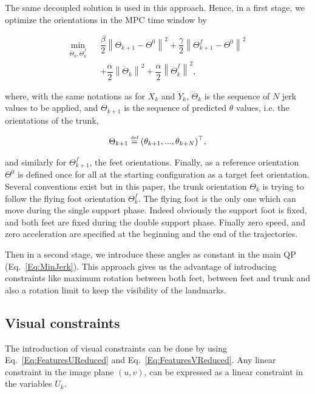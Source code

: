The same decoupled solution is used in this approach. Hence, in a first stage, we optimize the orientations in the MPC time window by  

{\small
\begin{eqnarray}
 \min\limits_{\dddot{\Theta}_{k},\dddot{\Theta}^{f}_k }  &&  \dfrac{\beta}{2} \left\| \Theta_{k+1} - \Theta^{0} \right\|^2 + \dfrac{\gamma}{2} \left\| \Theta^{f}_{k+1} - \Theta^{0} \right\|^2 \\
\nonumber && + \dfrac{\alpha}{2} \left\| \dddot{\Theta}_{k} \right\|^2 + \dfrac{\alpha}{2} \left\| \dddot{\Theta}^f_{k} \right\|^2,
\end{eqnarray}
}

where, with the same notations as for $\dddot{X}_k$ and $\dddot{Y}_k$, $\dddot{\Theta}_{k}$ is the sequence of $N$ jerk values to be applied, and $\Theta_{k+1}$ is the sequence of predicted $\theta$ values, i.e. the orientations of the trunk,  

$$
\Theta_{k+1} \stackrel{\mbox{\tiny def}}{=} (\theta_{k+1},...,\theta_{k+N})^{\top},
$$

and similarly for $\Theta^f_{k+1}$, the feet orientations. Finally, as a reference orientation $\Theta^{0}$ is defined once for all at the starting configuration as a target feet orientation. Several conventions exist but in this paper, the trunk orientation $\Theta_{k}$ is trying to follow the flying foot orientation $\Theta^f_{k}$. The flying foot is the only one which can move during the single support phase. Indeed obviously the support foot is fixed, and both feet are fixed during the double support phase. Finally zero speed, and zero acceleration are specified at the beginning and the end of the trajectories.

Then in a second stage, we introduce these angles as constant in the main QP (Eq.~\ref{Eq:MinJerk}). This approach gives us the advantage of introducing constraints like maximum rotation between both feet, between feet and trunk and also a rotation limit to keep the visibility of the landmarks.

\subsection{Visual constraints}


The introduction of visual constraints can be done by using Eq.~\ref{Eq:FeaturesUReduced} and Eq.~\ref{Eq:FeaturesVReduced}. Any linear constraint in the image plane $(u,v)$, can be expressed as a linear constraint in the variables $U_k$.

